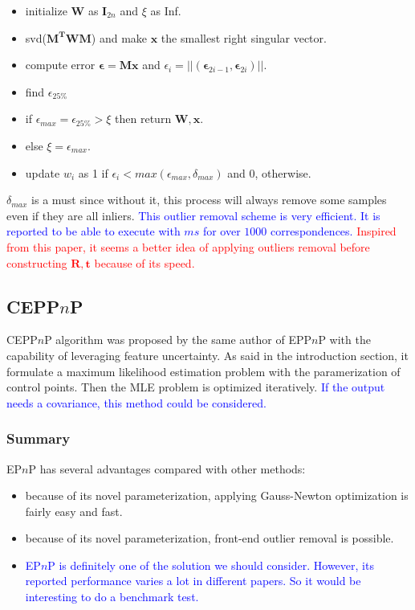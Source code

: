 \documentclass[a4paper]{report}
\begin{document}
\begin{itemize}
	\item initialize $\mathbf{W}$ as $\mathbf{I}_{2n}$ and $\xi$ as Inf.
	\item svd($\mathbf{M^TWM}$) and make $\mathbf{x}$ the smallest right singular vector.
	\item compute error $\mathbf{\epsilon}=\mathbf{Mx}$ and $\epsilon_i=||(\mathbf{\epsilon}_{2i-1}, \mathbf{\epsilon}_{2i})||$.
	\item find $\epsilon_{25\%}$
	\item if $\epsilon_{max}=\epsilon_{25\%}>\xi$ then return $\mathbf{W,x}$.
	\item else $\xi=\epsilon_{max}$.
	\item update $w_i$ as 1 if $\epsilon_i < max(\epsilon_{max}, \delta_{max})$ and 0, otherwise.
\end{itemize}
$\delta_{max}$ is a must since without it, this process will always remove some samples even if they are all inliers. \textcolor{blue}{This outlier removal scheme is very efficient. It is reported to be able to execute with $ms$ for over $1000$ correspondences.} \textcolor{red}{Inspired from this paper, it seems a better idea of applying outliers removal before constructing $\mathbf{R,t}$ because of its speed.}

\subsection{CEPP$n$P}
CEPP$n$P algorithm was proposed by the same author of EPP$n$P with the capability of leveraging feature uncertainty. As said in the introduction section, it formulate a maximum likelihood estimation problem with the paramerization of control points. Then the MLE problem is optimized iteratively. \textcolor{blue}{If the output needs a covariance, this method could be considered.}

\subsubsection{Summary}
EP$n$P has several advantages compared with other methods:
\begin{itemize}
	\item because of its novel parameterization, applying Gauss-Newton optimization is fairly easy and fast.
	\item because of its novel parameterization, front-end outlier removal is possible.
	\item \textcolor{blue}{EP$n$P is definitely one of the solution we should consider. However, its reported performance varies a lot in different papers. So it would be interesting to do a benchmark test.}
\end{itemize}
\end{document}
